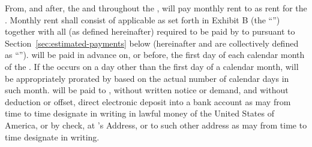 From, and after, the \rentCommencementDate and throughout the \termOfLease, \lessee will pay monthly rent to \lessor as rent for the \premises. Monthly rent shall consist of applicable \baseMonthlyRent as set forth in Exhibit B (the ``\baseMonthlyRent'') together with all  (as defined hereinafter) required to be paid by \lessee to \lessor pursuant to Section~\ref{sec:estimated-payments} below (hereinafter \baseMonthlyRent and \additionalRent are collectively defined as ``''). \monthlyRent will be paid in advance on, or before, the first day of each calendar month of the \termOfLease.  If the \rentCommencementDate occurs on a day other than the first day of a calendar month, \monthlyRent will be appropriately prorated by \lessor based on the actual number of calendar days in such month. \monthlyRent will be paid to \lessor, without written notice or demand, and without deduction or offset, direct electronic deposit into a bank account as \lessor may from time to time designate in writing in lawful money of the United States of America, or by check, at \lessor's Address, or to such other address as \lessor may from time to time designate in writing.
